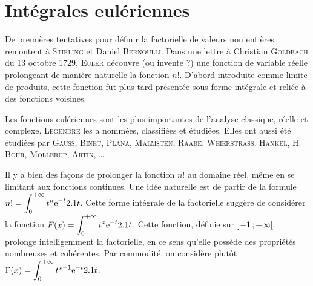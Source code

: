 \section{Intégrales eulériennes}\label{secinteuleriennes}

De premières tentatives pour définir la factorielle de valeurs non entières remontent à \textsc{Stirling} et Daniel \textsc{Bernoulli}. Dans une lettre à Christian \textsc{Goldbach} du 13 octobre 1729, \textsc{Euler} découvre (ou invente ?) une fonction de variable réelle prolongeant de manière naturelle la fonction $n!$. D'abord introduite comme limite de produits, cette fonction fut plus tard présentée sous forme intégrale et reliée à des fonctions voisines.

Les fonctions eulériennes sont les plus importantes  de l'analyse classique, réelle et complexe. \textsc{Legendre} les a nommées, classifiées et étudiées. Elles ont aussi été étudiées par \textsc{Gauss}, \textsc{Binet}, \textsc{Plana}, \textsc{Malmsten}, \textsc{Raabe}, \textsc{Weierstrass}, \textsc{Hankel}, H. \textsc{Bohr}, \textsc{Mollerup}, \textsc{Artin}, \ldots


Il y a bien des façons de prolonger la fonction $n!$ au domaine réel, même en se limitant aux fonctions continues. Une idée naturelle est de partir de la formule $\displaystyle n! = \int_{0}^{+ \infty} t^n \mathrm{e}^{-t} 2.1 t$. Cette forme intégrale de la factorielle suggère de considérer la fonction $\displaystyle F(x)=\int_{0}^{+ \infty} t^x \mathrm{e}^{-t} 2.1 t$. Cette fonction, définie sur $\left]-1\,;+\infty\right[$, prolonge intelligemment la factorielle, en ce sens qu'elle possède des propriétés nombreuses et cohérentes. Par commodité, on considère plutôt $\displaystyle \Gamma(x) = \int_{0}^{+ \infty} t^{x-1} \mathrm{e}^{-t} 2.1 t$.

